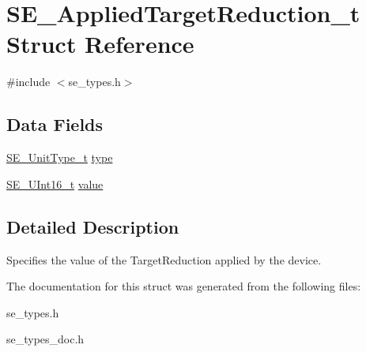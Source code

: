 \hypertarget{structSE__AppliedTargetReduction__t}{}\section{S\+E\+\_\+\+Applied\+Target\+Reduction\+\_\+t Struct Reference}
\label{structSE__AppliedTargetReduction__t}


{\ttfamily \#include $<$se\+\_\+types.\+h$>$}

\subsection*{Data Fields}
\begin{DoxyCompactItemize}
\item 
\hyperlink{group__UnitType_ga402dc1288733e4df30c6ae69e947cebe}{S\+E\+\_\+\+Unit\+Type\+\_\+t} \hyperlink{group__AppliedTargetReduction_ga3af211b30214fb46680092fe25e0d7b9}{type}
\item 
\hyperlink{group__UInt16_gac68d541f189538bfd30cfaa712d20d29}{S\+E\+\_\+\+U\+Int16\+\_\+t} \hyperlink{group__AppliedTargetReduction_gad13505880133924960036379d13948c9}{value}
\end{DoxyCompactItemize}


\subsection{Detailed Description}
Specifies the value of the Target\+Reduction applied by the device. 

The documentation for this struct was generated from the following files\+:\begin{DoxyCompactItemize}
\item 
se\+\_\+types.\+h\item 
se\+\_\+types\+\_\+doc.\+h\end{DoxyCompactItemize}
